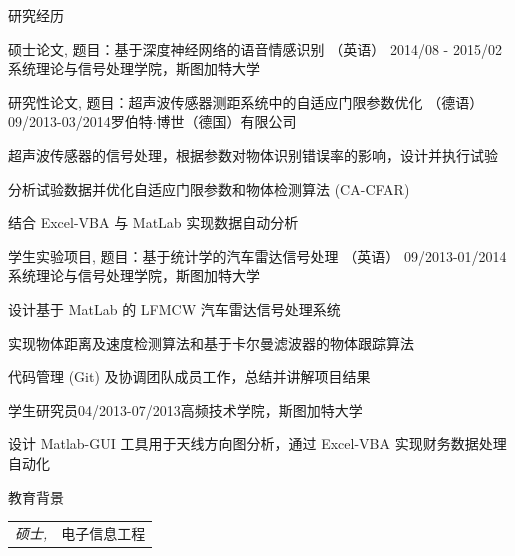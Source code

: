 \documentclass{resume} %
\begin{document}
\begin{CJK*}{UTF8}{gbsn}
\begin{rSection}{研究经历}
\begin{rSubsection}{硕士论文,  题目：基于深度神经网络的语音情感识别 （英语）
}{2014/08 - 2015/02}{系统理论与信号处理学院，斯图加特大学}{}
\end{rSubsection}


\begin{rSubsection}{研究性论文, 题目：超声波传感器测距系统中的自适应门限参数优化 （德语）}{09/2013-03/2014}{罗伯特$\cdot$博世（德国）有限公司}{}
\item 超声波传感器的信号处理，根据参数对物体识别错误率的影响，设计并执行试验
\item 分析试验数据并优化自适应门限参数和物体检测算法 (CA-CFAR)
\item 结合 Excel-VBA 与 MatLab 实现数据自动分析
\end{rSubsection}


\begin{rSubsection}{学生实验项目, 题目：基于统计学的汽车雷达信号处理 （英语）
}{09/2013-01/2014}{系统理论与信号处理学院，斯图加特大学}{}

\item 设计基于 MatLab 的 LFMCW 汽车雷达信号处理系统
\item 实现物体距离及速度检测算法和基于卡尔曼滤波器的物体跟踪算法
\item 代码管理 (Git) 及协调团队成员工作，总结并讲解项目结果

\end{rSubsection}

 \begin{rSubsection}{学生研究员}{04/2013-07/2013}{高频技术学院，斯图加特大学}{}
 
 \item 设计 Matlab-GUI 工具用于天线方向图分析，通过 Excel-VBA 实现财务数据处理自动化
 
 \end{rSubsection}
\end{rSection}


\begin{rSection}{教育背景}
\begin{tabular}{l l}
 
{\sl 硕士,} & 电子信息工程\\
\end{tabular}


\end{rSection}
\end{CJK*}
\end{document}
